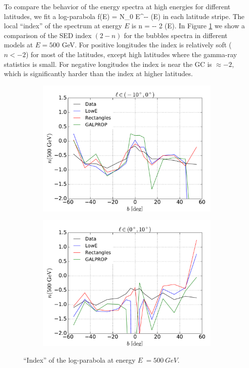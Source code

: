 To compare the behavior of the energy spectra at high energies for different latitudes, 
we fit a log-parabola
 \be
 f(E) = N_0 E^{-\alpha - \beta \ln(E)}
 \ee
in each latitude stripe. The local ``index'' of the spectrum at energy $E$ is
 \be 
n \equiv {} = -\alpha - 2 \beta \ln(E).
 \ee
In Figure \ref{fig:logpar_index} we show a comparison of the SED index $(2 - n)$
for the bubbles spectra in different models at $E = 500$ GeV.
For positive longitudes the index is relatively soft ($n < -2$) for most of the latitudes, 
except high latitudes where the gamma-ray statistics is small.
For negative longitudes the index is near the GC is $\approx -2$, 
which is significantly harder than the index at higher latitudes.
\begin{figure}[h!]
    \begin{subfigure}{0.5\textwidth}
        \includegraphics[width=\textwidth]{plots/LogParabola_n(500GeV)_l_in_(-10,0).pdf}
    \end{subfigure} 
    \begin{subfigure}{0.5\textwidth}
        \includegraphics[width=\textwidth]{plots/LogParabola_n(500GeV)_l_in_(0,10).pdf}
    \end{subfigure}
  	\caption{``Index'' of the log-parabola at energy $E\ = \SI{500}{GeV}$.}
  	\label{fig:logpar_index}
\end{figure}


